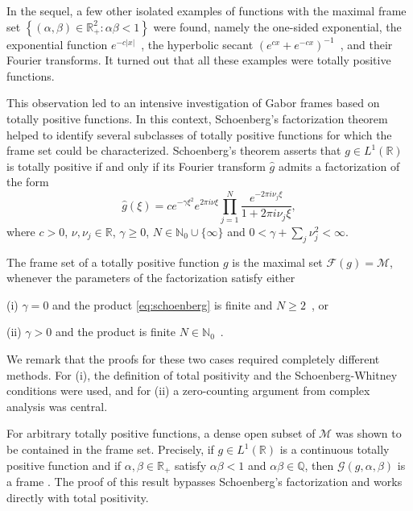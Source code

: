 \documentclass[reqno,a4paper,12pt]{amsart}
\numberwithin{equation}{section}
\def\N{{\mathbb N}}
\def\R{{\mathbb R}}
\def\Q{{\mathbb Q}}
\newcommand\1{\mathds{1}}
\newcommand{\ft}{{\mathcal{F}}}
\newcommand{\cG}{\mathcal{G}}
\begin{document}
In the sequel, a few  other isolated  examples of functions with the maximal
frame set $\left \{  (\alpha,\beta) \in \R_{+}^2 : \alpha\beta < 1
\right \}$   were found, namely the one-sided exponential, the
exponential function $e^{-c|x|}$~\cite{Janssen1996}, the hyperbolic secant $(e^{cx}+
e^{-cx})^{-1}$~\cite{janssen2002hyperbolic}, and their Fourier transforms.  It turned out that all
these  examples were  totally positive functions. 

This observation led to an intensive investigation of Gabor frames
based on totally positive functions. In this context,  Schoenberg's
factorization theorem helped to identify several subclasses of totally
positive functions for which the frame set could be
characterized. Schoenberg's theorem \cite{Schoenberg1951} asserts that
$g \in L^1(\R)$ is totally positive if and only if its  Fourier transform $\hat g$ admits a factorization of the form
\begin{equation}\label{eq:schoenberg}
    \hat{g}(\xi)
=
c e^{-\gamma \xi^2} e^{2\pi i \nu \xi}
\prod_{j=1}^{N}
\frac{e^{-2\pi i \nu_j \xi}}{1 + 2\pi i \nu_j \xi},
\end{equation}
where $c>0$, $\nu,\nu_j \in \mathbb{R}$, $\gamma \geq 0$, $N \in \mathbb{N}_0\cup\{\infty\}$ and
$
0 < \gamma + \sum_j \nu_j^2 < \infty.
$

The frame set of a totally positive function $g$ is the maximal set
$\ft(g) = \mathcal{M}$, whenever the parameters of the factorization satisfy either 

(i) $\gamma = 0$ and the product \eqref{eq:schoenberg} is finite and
$N\geq 2$~\cite{GroechenigStoeckler2013}, or

(ii) $\gamma >0$ and the product is finite $N\in \N
_0$~\cite{grochenig2018sampling}.

We remark that the proofs for these two cases required completely
different methods.  For (i), the definition of total positivity and the
Schoenberg-Whitney conditions were used, and  for (ii) a zero-counting
argument from complex analysis was central. 

For arbitrary totally positive functions, a dense open subset of
$\mathcal{M}$
was shown to be contained in the frame set. Precisely,  if $g \in L^1(\R)$
is a continuous totally positive function and if $\alpha,\beta \in
\R_+$ satisfy $\alpha\beta < 1$ and $\alpha\beta \in \Q$, then
$\cG(g,\alpha,\beta)$ is a frame \cite{Groechenig2023}. The proof of
this result bypasses Schoenberg's factorization and works directly
with total positivity.
\end{document}
